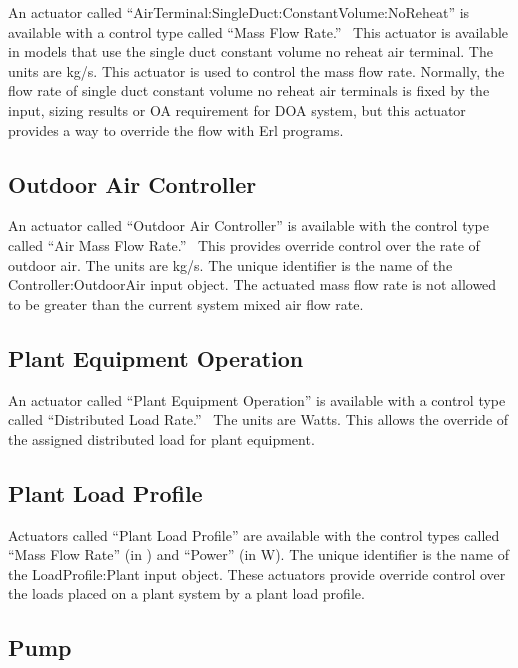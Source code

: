 An actuator called ``AirTerminal:SingleDuct:ConstantVolume:NoReheat'' is available with a control type called ``Mass Flow Rate.''~ This actuator is available in models that use the single duct constant volume no reheat air terminal. The units are kg/s. This actuator is used to control the mass flow rate. Normally, the flow rate of single duct constant volume no reheat air terminals is fixed by the input, sizing results or OA requirement for DOA system, but this actuator provides a way to override the flow with Erl programs.

\subsection{Outdoor Air Controller}\label{outdoor-air-controller}

An actuator called ``Outdoor Air Controller'' is available with the control type called ``Air Mass Flow Rate.'' ~This provides override control over the rate of outdoor air. The units are kg/s. The unique identifier is the name of the Controller:OutdoorAir input object. The actuated mass flow rate is not allowed to be greater than the current system mixed air flow rate.

\subsection{Plant Equipment Operation}\label{plant-equipment-operation}

An actuator called ``Plant Equipment Operation'' is available with a control type called ``Distributed Load Rate.''~ The units are Watts.  This allows the override of the assigned distributed load for plant equipment.

\subsection{Plant Load Profile}\label{plant-load-profile}

Actuators called ``Plant Load Profile'' are available with the control types called ``Mass Flow Rate'' (in \si{\massFlowRate}) and ``Power'' (in W). The unique identifier is the name of the LoadProfile:Plant input object. These actuators provide override control over the loads placed on a plant system by a plant load profile.

\subsection{Pump}\label{pump}

